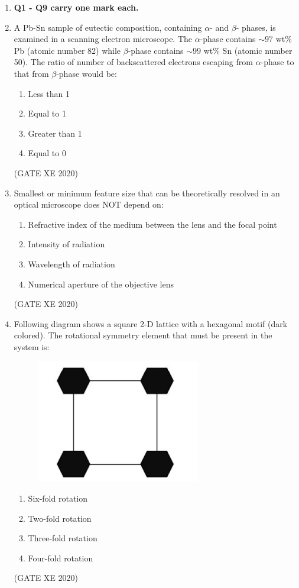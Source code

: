 \documentclass[12pt]{article}
\begin{document}
\begin{enumerate}

\item[] \textbf{Q1 - Q9 carry one mark each.}

\item A Pb-Sn sample of eutectic composition, containing $\alpha$- and $\beta$- phases, is examined in a scanning electron microscope. The $\alpha$-phase contains $\sim 97$ wt\% Pb (atomic number 82) while $\beta$-phase contains $\sim 99$ wt\% Sn (atomic number 50). The ratio of number of backscattered electrons escaping from $\alpha$-phase to that from $\beta$-phase would be:
\begin{enumerate}
    \item Less than 1
    \item Equal to 1
    \item Greater than 1
    \item Equal to 0
\end{enumerate}
(GATE XE 2020)

\item Smallest or minimum feature size that can be theoretically resolved in an optical microscope does NOT depend on:
\begin{enumerate}
    \item Refractive index of the medium between the lens and the focal point
    \item Intensity of radiation
    \item Wavelength of radiation
    \item Numerical aperture of the objective lens
\end{enumerate}
(GATE XE 2020)

\item Following diagram shows a square 2-D lattice with a hexagonal motif (dark colored). The rotational symmetry element that must be present in the system is:

\begin{figure}[H]
    \centering
    \includegraphics[width=0.5\columnwidth]{figs/ass4_c_q3.png}
    \caption{}
    \label{fig:placeholder}
\end{figure}
\begin{enumerate}
    \item Six-fold rotation
    \item Two-fold rotation
    \item Three-fold rotation
    \item Four-fold rotation
\end{enumerate}
(GATE XE 2020)


\end{enumerate}
\end{document}
